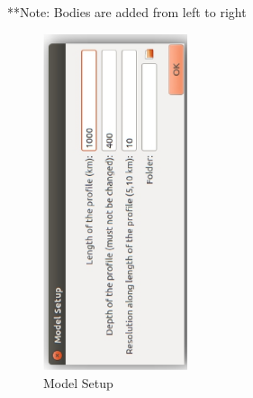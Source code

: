\documentclass[14pt]{article}
\begin{document}
**Note: Bodies are added from left to right
\begin{figure}
\centering \includegraphics[width=10pc,angle=-90]{./build1.eps}
\caption{Model Setup}
\label{build1}
\end{figure}
\end{document}
